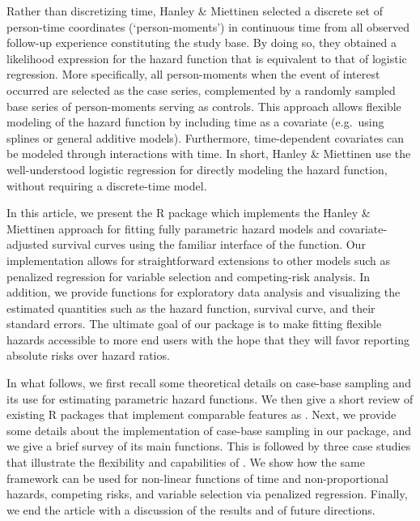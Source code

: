 Rather than discretizing time, Hanley \& Miettinen
\citeyearpar{hanley2009fitting} selected a discrete set of person-time
coordinates (`person-moments') in continuous time from all observed
follow-up experience constituting the study base. By doing so, they
obtained a likelihood expression for the hazard function that is
equivalent to that of logistic regression. More specifically, all
person-moments when the event of interest occurred are selected as the
case series, complemented by a randomly sampled base series of
person-moments serving as controls. This approach allows flexible
modeling of the hazard function by including time as a covariate
(e.g.~using splines or general additive models). Furthermore,
time-dependent covariates can be modeled through interactions with time.
In short, Hanley \& Miettinen \citeyearpar{hanley2009fitting} use the
well-understood logistic regression for directly modeling the hazard
function, without requiring a discrete-time model.

In this article, we present the  R package
\citep{casebase-package} which implements the Hanley \& Miettinen
\citeyearpar{hanley2009fitting} approach for fitting fully parametric
hazard models and covariate-adjusted survival curves using the familiar
interface of the  function. Our implementation allows for
straightforward extensions to other models such as penalized regression
for variable selection and competing-risk analysis. In addition, we
provide functions for exploratory data analysis and visualizing the
estimated quantities such as the hazard function, survival curve, and
their standard errors. The ultimate goal of our package is to make
fitting flexible hazards accessible to more end users with the hope that
they will favor reporting absolute risks over hazard ratios.

In what follows, we first recall some theoretical details on case-base
sampling and its use for estimating parametric hazard functions. We then
give a short review of existing R packages that implement comparable
features as . Next, we provide some details about the
implementation of case-base sampling in our package, and we give a brief
survey of its main functions. This is followed by three case studies
that illustrate the flexibility and capabilities of . We
show how the same framework can be used for non-linear functions of time
and non-proportional hazards, competing risks, and variable selection
via penalized regression. Finally, we end the article with a discussion
of the results and of future directions.

